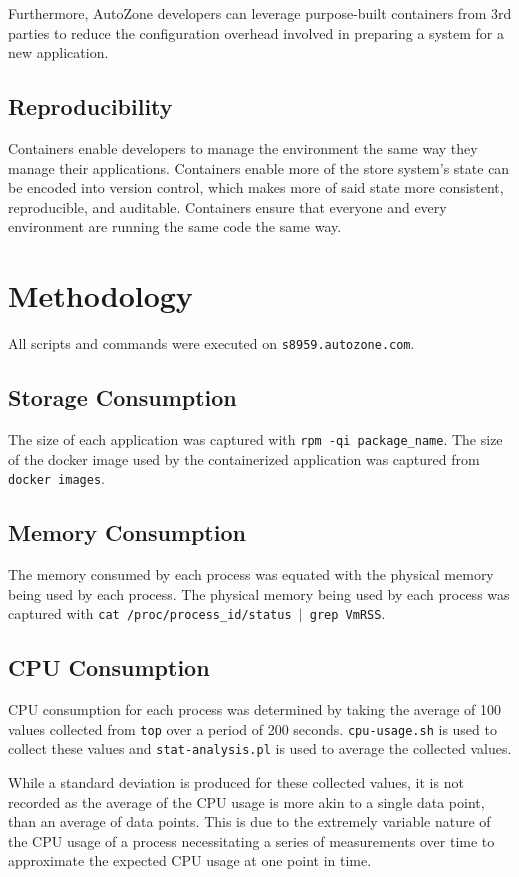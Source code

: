 \documentclass{article}
\begin{document}
Furthermore, AutoZone developers can leverage purpose-built containers from 3rd parties to reduce the configuration overhead involved in preparing a system for a new application.

\subsection{Reproducibility}
Containers enable developers to manage the environment the same way they manage their applications. Containers enable more of the store system's state can be encoded into version control, which makes more of said state more consistent, reproducible, and auditable. Containers ensure that everyone and every environment are running the same code the same way.

\section{Methodology}
All scripts and commands were executed on \texttt{s8959.autozone.com}.

\subsection{Storage Consumption}
The size of each application was captured with \texttt{rpm -qi package\_name}. The size of the docker image used by the containerized application was captured from \texttt{docker images}.

\subsection{Memory Consumption}
The memory consumed by each process was equated with the physical memory being used by each process. The physical memory being used by each process was captured with \texttt{cat /proc/process\_id/status $|$ grep VmRSS}.

\subsection{CPU Consumption}
CPU consumption for each process was determined by taking the average of 100 values collected from \texttt{top} over a period of 200 seconds. \texttt{cpu-usage.sh} is used to collect these values and \texttt{stat-analysis.pl} is used to average the collected values.

While a standard deviation is produced for these collected values, it is not recorded as the average of the CPU usage is more akin to a single data point, than an average of data points. This is due to the extremely variable nature of the CPU usage of a process necessitating a series of measurements over time to approximate the expected CPU usage at one point in time.
\end{document}
